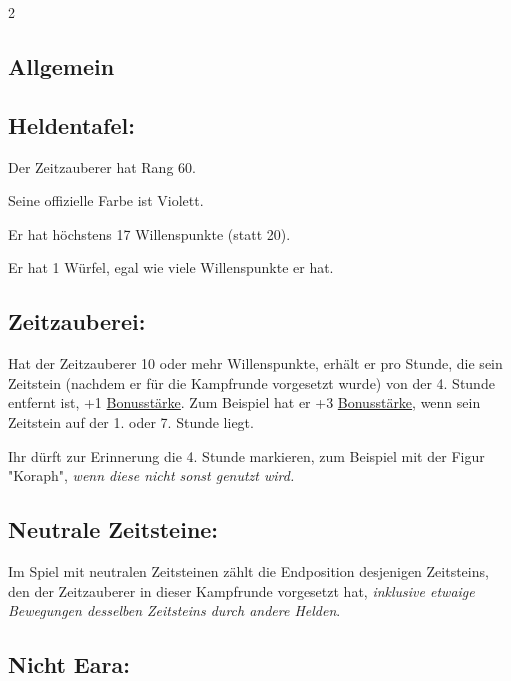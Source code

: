 \documentclass[10pt, a4paper, oneside]{book}
\newcommand{\fan}[1]{\textit{#1}}
\begin{document}
\begin{multicols*}{2}\raggedcolumns



\begin{nobgcolor}

\section{Allgemein}


\subsection{Heldentafel:}

Der Zeitzauberer hat Rang 60.

Seine offizielle Farbe ist Violett.

Er hat höchstens 17 Willenspunkte (statt 20).

Er hat 1 Würfel, egal wie viele Willenspunkte er hat.




\subsection{Zeitzauberei:}

Hat der Zeitzauberer 10 oder mehr Willenspunkte, erhält er pro Stunde, die sein Zeitstein (nachdem er für die Kampfrunde vorgesetzt wurde) von der 4. Stunde entfernt ist, +1 \hyperref[bonusstaerke]{Bonusstärke}. Zum Beispiel hat er +3 \hyperref[bonusstaerke]{Bonusstärke}, wenn sein Zeitstein auf der 1. oder 7. Stunde liegt.
\supercite{bl-rdsk-kirr}


Ihr dürft zur Erinnerung die 4. Stunde markieren, zum Beispiel mit der Figur "Koraph", \fan{wenn diese nicht sonst genutzt wird.}




\subsection{Neutrale Zeitsteine:}

Im Spiel mit neutralen Zeitsteinen zählt die Endposition desjenigen Zeitsteins, den der Zeitzauberer in dieser Kampfrunde vorgesetzt hat, \fan{inklusive etwaige Bewegungen desselben Zeitsteins durch andere Helden}.




\subsection{Nicht Eara:}


\end{nobgcolor}
\end{multicols*}
\end{document}
